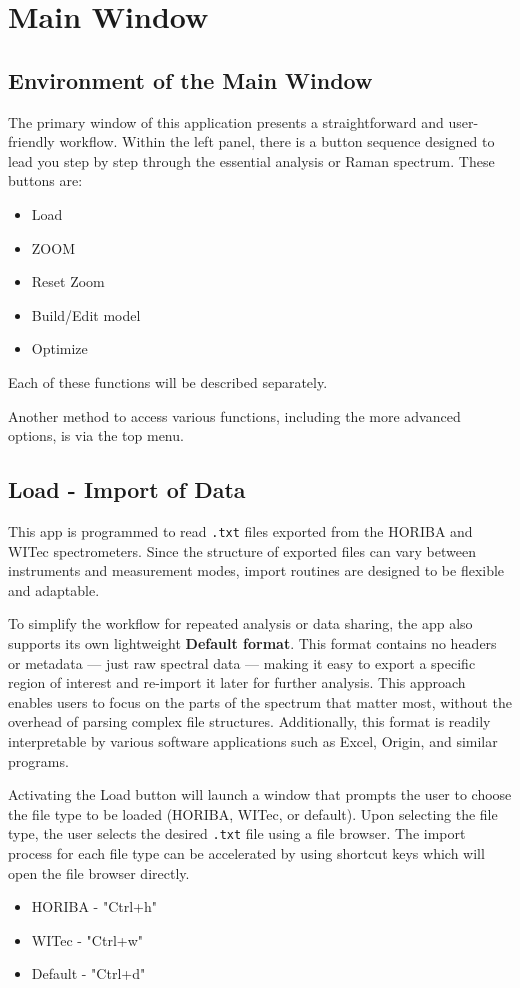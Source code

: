 \chapter{Main Window}
\label{cha:Main Window}
\section{Environment of the Main Window}
The primary window of this application presents a straightforward and user-friendly workflow. Within the left panel, there is a button sequence designed to lead you step by step through the essential analysis or Raman spectrum. These buttons are:

\begin{itemize}
    \item Load
    \item ZOOM
    \item Reset Zoom
    \item Build/Edit model
    \item Optimize
\end{itemize}

Each of these functions will be described separately.

Another method to access various functions, including the more advanced options, is via the top menu.

\section{Load - Import of Data}

This app is programmed to read \texttt{.txt} files exported from the HORIBA and WITec spectrometers. Since the structure of exported files can vary between instruments and measurement modes, import routines are designed to be flexible and adaptable.

To simplify the workflow for repeated analysis or data sharing, the app also supports its own lightweight \textbf{Default format}. This format contains no headers or metadata — just raw spectral data — making it easy to export a specific region of interest and re-import it later for further analysis. This approach enables users to focus on the parts of the spectrum that matter most, without the overhead of parsing complex file structures. Additionally, this format is readily interpretable by various software applications such as Excel, Origin, and similar programs.

Activating the Load button will launch a window that prompts the user to choose the file type to be loaded (HORIBA, WITec, or default). Upon selecting the file type, the user selects the desired \texttt{.txt} file using a file browser. The import process for each file type can be accelerated by using shortcut keys which will open the file browser directly.
\begin{itemize}
    \item HORIBA - "Ctrl+h"
    \item WITec - "Ctrl+w"
    \item Default - "Ctrl+d"
\end{itemize}

